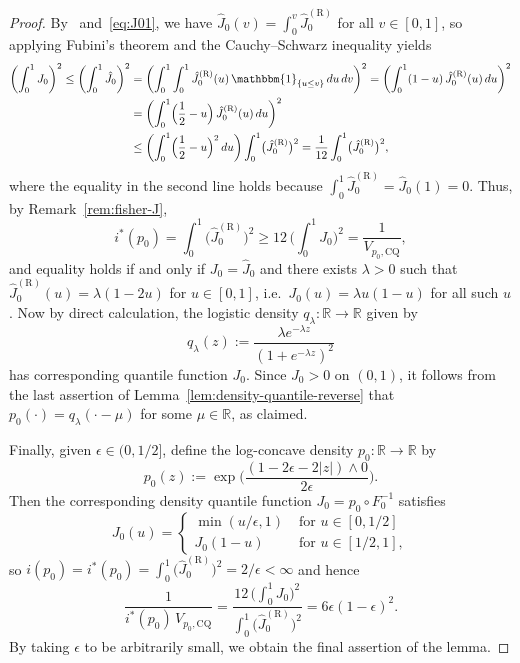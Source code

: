 \documentclass[a4paper]{article}
\newcommand{\R}{\mathbb{R}}
\newcommand{\Ind}{\mathbbm{1}}
\theoremstyle{definition}
\begin{document}
\begin{proof}
By~\citet[Corollary~24.2.1]{rockafellar97convex} and~\eqref{eq:J01}, we have $\hat{J}_0(v) = \int_0^v \hat{J}_0^{(\mathrm{R})}$ for all $v \in [0,1]$, so applying Fubini's theorem and the Cauchy--Schwarz inequality yields
\begin{align*}
\biggl(\int_0^1 J_0\biggr)^2 \leq \biggl(\int_0^1 \hat{J}_0\biggr)^2 &= \biggl(\int_0^1 \int_0^1 \hat{J}_0^{(\mathrm{R})}(u)\,\Ind_{\{u \leq v\}}\,du\,dv\biggr)^2 = \biggl(\int_0^1 (1 - u)\,\hat{J}_0^{(\mathrm{R})}(u)\,du\biggr)^2 \\
&= \biggl(\int_0^1 \Bigl(\frac{1}{2} - u\Bigr)\,\hat{J}_0^{(\mathrm{R})}(u)\,du\biggr)^2 \\
&\leq \biggl(\int_0^1 \Bigl(\frac{1}{2} - u\Bigr)^2\,du\biggr)\int_0^1 \bigl(\hat{J}_0^{(\mathrm{R})}\bigr)^2 = \frac{1}{12}\int_0^1 \bigl(\hat{J}_0^{(\mathrm{R})}\bigr)^2,
\end{align*}
where the equality in the second line holds because $\int_0^1 \hat{J}_0^{(\mathrm{R})} = \hat{J}_0(1) = 0$. Thus, by Remark~\ref{rem:fisher-J},
\[
i^*(p_0) = \int_0^1 \bigl(\hat{J}_0^{(\mathrm{R})}\bigr)^2 \geq 12\,\biggl(\int_0^1 J_0\biggr)^2 = \frac{1}{V_{p_0,\mathrm{CQ}}},
\]
and equality holds if and only if $J_0 = \hat{J}_0$ and there exists $\lambda > 0$ such that $\hat{J}_0^{(\mathrm{R})}(u) = \lambda(1 - 2u)$ for $u \in [0,1]$, i.e.~$
J_0(u) = \lambda u(1 - u)$ for all such $u$. Now by direct calculation, the logistic density $q_\lambda \colon \R \to \R$ given by
\[
q_\lambda(z) := \frac{\lambda e^{-\lambda z}}{(1 + e^{-\lambda z})^2}
\]
has corresponding quantile function $J_0$. Since $J_0 > 0$ on $(0,1)$, it follows from the last assertion of Lemma~\ref{lem:density-quantile-reverse} that $p_0(\cdot) = q_\lambda(\cdot - \mu)$ for some $\mu \in \R$, as claimed.

Finally, given $\epsilon \in (0,1/2]$, define the log-concave density $p_0 \colon \R \to \R$ by
\[
p_0(z) := \exp\biggl(\frac{(1 - 2\epsilon - 2|z|) \wedge 0}{2\epsilon}\biggr).
\]
Then the corresponding density quantile function $J_0 = p_0 \circ F_0^{-1}$ satisfies
\[
J_0(u) =
\begin{cases}
\min(u/\epsilon, 1) \;&\text{for }u \in [0,1/2] \\
J_0(1 - u) \;&\text{for }u \in [1/2,1],
\end{cases}
\]
so $i(p_0) = i^*(p_0) = \int_0^1 \bigl(\hat{J}_0^{(\mathrm{R})}\bigr)^2 = 2/\epsilon < \infty$ and hence
\[
\frac{1}{i^*(p_0)\,V_{p_0,\mathrm{CQ}}} = \frac{12\,\bigl(\int_0^1 J_0\bigr)^2}{\int_0^1 \bigl(\hat{J}_0^{(\mathrm{R})}\bigr)^2} = 6\epsilon(1 - \epsilon)^2.
\]
By taking $\epsilon$ to be arbitrarily small, we obtain the final assertion of the lemma.
\end{proof}
\end{document}
